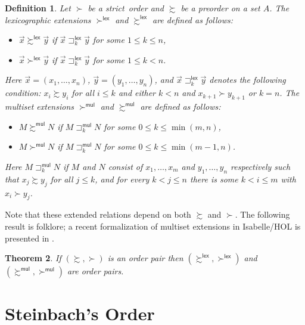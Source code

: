 \documentclass{tlp}
\newcommand{\qed}{\hspace*{1em}\hbox{\proofbox}}
\newtheorem{theorem}{Theorem}[section]
\newtheorem{definition}[theorem]{Definition}
\newcommand{\m}[1]{\mathsf{#1}}
\newcommand{\lex}{\m{lex}}
\newcommand{\mul}{\m{mul}}
\newcommand{\seq}[2][n]{{#2_1},\dots,{#2_{#1}}}
\newcommand{\proper}{proper}
\renewcommand{\proper}{strict}
\newcommand{\GT}{\mathrel{\succ}}
\newcommand{\GS}{\mathrel{\succsim}}
\begin{document}
\begin{definition}
\label{lex and mul}
Let $\GT$ be a \proper\ order and $\GS$ be a preorder on a set $A$.
The \emph{lexicographic extensions} $\GT^\lex$ and $\GS^\lex$
are defined as follows:
\begin{itemize}
\item
$\vec{x} \GS^\lex \vec{y}$ if $\vec{x} \sqsupset_k^\lex \vec{y}$
for some $1 \leqslant k \leqslant n$,
\item
\smallskip
$\vec{x} \GT^\lex \vec{y}$ if $\vec{x} \sqsupset_k^\lex \vec{y}$
for some $1 \leqslant k < n$.
\end{itemize}
Here $\vec{x} = (\seq{x})$, $\vec{y} = (\seq{y})$, and
$\vec{x} \sqsupset_k^\lex \vec{y}$ denotes the following condition:
$x_i \GS y_i$ for all $i \leqslant k$ and either 
$k < n$ and $x_{k+1} \GT y_{k+1}$ or $k = n$.
The \emph{multiset extensions} $\GT^\mul$ and $\GS^\mul$ are
defined as follows:
\begin{itemize}
\item
$M \GS^\mul N$ if $M \sqsupset_k^\mul N$ for some
$0 \leqslant k \leqslant \min(m,n)$,
\item
\smallskip
$M \GT^\mul N$ if $M \sqsupset_k^\mul N$ for some
$0 \leqslant k \leqslant \min(m-1,n)$.
\end{itemize}
Here $M \sqsupset_k^\mul N$ if $M$ and $N$ consist of $\seq[m]{x}$ 
and $\seq{y}$ respectively such that $x_j \GS y_j$ for all 
$j \leqslant k$, and for every $k < j \leqslant n$ there is some
$k < i \leqslant m$ with $x_i \GT y_j$.
\end{definition}

Note that these extended relations depend on both $\GS$ and $\GT$.
The following result is folklore;
a recent formalization of multiset
extensions in Isabelle/HOL is presented in \cite{TAN12}.

\begin{theorem}
\label{thm:order pair}
If $(\GS,\GT)$ is an order pair then $(\GS^\lex,\GT^\lex)$
and $(\GS^\mul,\GT^\mul)$ are order pairs.
\qed
\end{theorem}

\section{Steinbach's Order}
\label{Steinbach}
\end{document}

